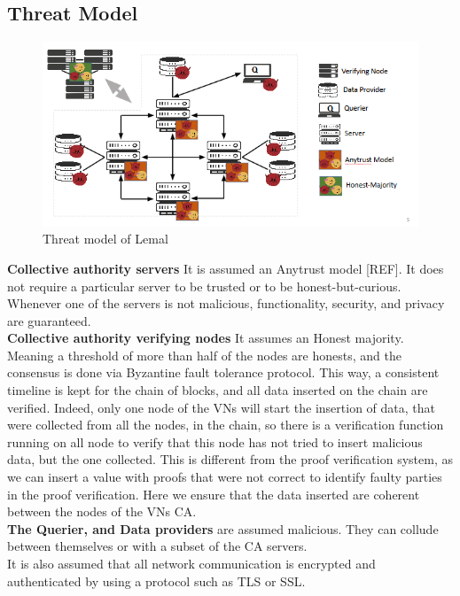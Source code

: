 \documentclass{article}
\begin{document}
\subsection{Threat Model}
\begin{figure}[H]
\center
\includegraphics[scale=0.75]{img/threatLemal.png}
\caption{Threat model of Lemal}
\end{figure}
\textbf{Collective authority servers} It is assumed an Anytrust model [REF]. It does not require a particular server to be trusted or to be honest-but-curious. Whenever one of the servers is not malicious, functionality, security, and privacy are guaranteed.\\
\textbf{Collective authority verifying nodes} It assumes an Honest majority. Meaning a threshold of more than half of the nodes are honests, and the consensus is done via Byzantine fault tolerance protocol. This way, a consistent timeline is kept for the chain of blocks, and all data inserted on the chain are verified. Indeed, only one node of the VNs will start the insertion of data, that were collected from all the nodes, in the chain, so there is a verification function running on all node to verify that this node has not tried to insert malicious data, but the one collected. This is different from the proof verification system, as we can insert a value with proofs that were not correct to identify faulty parties in the proof verification. Here we ensure that the data inserted are coherent between the nodes of the VNs CA.\\
\textbf{The Querier, and Data providers} are assumed malicious. They can collude between themselves or with a subset of the CA servers.\\
It is also assumed that all network communication is encrypted and authenticated by using a protocol such as TLS or SSL.
\end{document}

